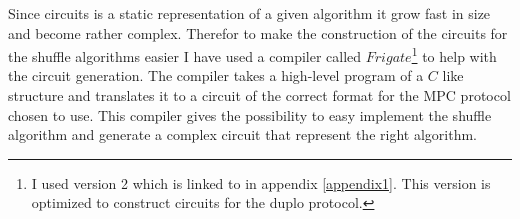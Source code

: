 \begin{table}
\label{truth_table}
\centering
{}
\caption{A table of the 16 different gate types that can be used in a circuit of the type used in duplo}
\end{table}

Since circuits is a static representation of a given algorithm it grow fast in size and become rather complex. Therefor to make the construction of the circuits for the shuffle algorithms easier I have used a compiler called $Frigate$\footnote{I used version 2 which is linked to in appendix \ref{appendix1}. This version is optimized to construct circuits for the duplo protocol.} to help with the circuit generation. The compiler takes a high-level program of a $C$ like structure and translates it to a circuit of the correct format for the MPC protocol chosen to use. This compiler gives the possibility to easy implement the shuffle algorithm and generate a complex circuit that represent the right algorithm.

